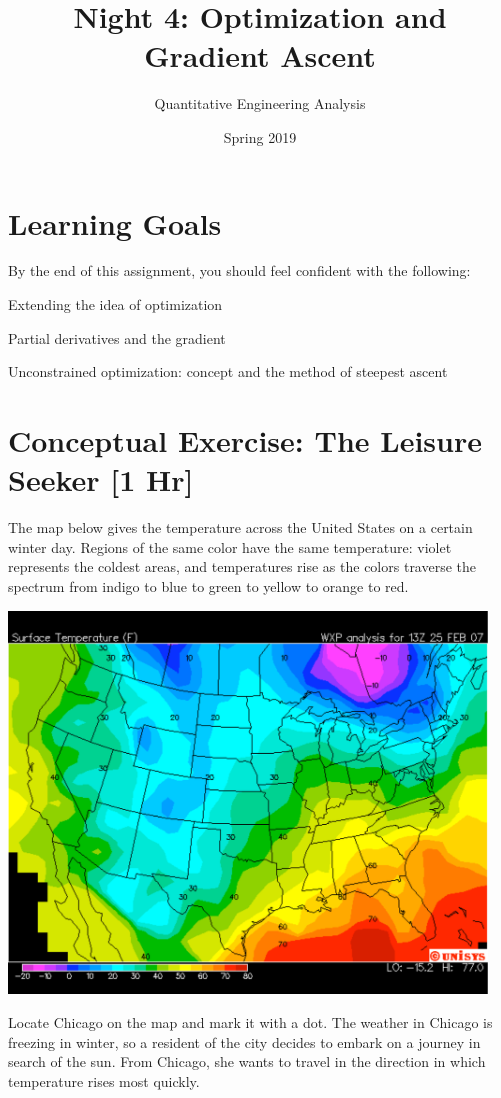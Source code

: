 \documentclass[M3_Night4_Solutions]{subfiles}
\title{Night 4: Optimization and Gradient Ascent}
\author{Quantitative Engineering Analysis}
\date{Spring 2019}
\begin{document}
\maketitle
\thispagestyle{firstpage}

\section{Learning Goals}
By the end of this assignment, you should feel confident with the following:
\bi
\item Extending the idea of optimization
\item Partial derivatives and the gradient
\item Unconstrained optimization: concept and the method of steepest ascent
\ei

\section{Conceptual Exercise: The Leisure Seeker [1 Hr]}

The map below gives the temperature across the United States on a certain winter day.  
Regions of the same color have the same temperature: violet 
represents the coldest areas, and temperatures rise as the colors traverse the 
spectrum from indigo to blue to green to yellow to orange to red.
\begin{center}

\includegraphics[width=5in]{figs/WeatherMap.pdf} 
\end{center}

Locate Chicago on the map and mark it with a dot.  The weather in Chicago is 
freezing in winter, so a resident of the city decides to embark on a journey in 
search of the sun.  From Chicago,  she wants to travel in the direction in which 
temperature rises most quickly.  
\end{document}
